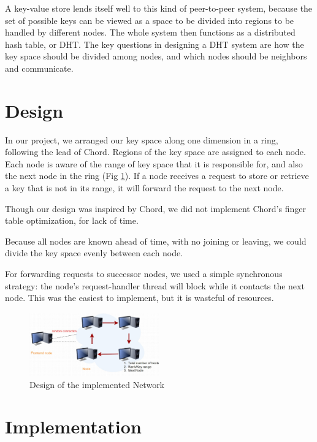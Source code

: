 \documentclass[11pt,conference]{IEEEtran}
\begin{document}
A key-value store lends itself well to this kind of peer-to-peer system, because
the set of possible keys can be viewed as a space to be divided into regions to
be handled by different nodes. The whole system then functions as a distributed
hash table, or DHT. The key questions in designing a DHT system are how the key
space should be divided among nodes, and which nodes should be neighbors and
communicate. \cite{p2plookup}



\section{Design}

In our project, we arranged our key space along one dimension in a ring,
following the lead of Chord\cite{chord}. Regions of the key space are assigned
to each node. Each node is aware of the range of key space that it is
responsible for, and also the next node in the ring (Fig \ref{fig:design}). If a
node receives a request to store or retrieve a key that is not in its range, it
will forward the request to the next node.

Though our design was inspired by Chord, we did not implement Chord's finger
table optimization, for lack of time.

Because all nodes are known ahead of time, with no joining or leaving, we could
divide the key space evenly between each node.

For forwarding requests to successor nodes, we used a simple synchronous
strategy: the node's request-handler thread will block while it contacts the
next node. This was the easiest to implement, but it is wasteful of resources.

\begin{figure}[h!]
  \centering
    \includegraphics[width=0.5\textwidth]{design}
    \caption{Design of the implemented Network}
    \label{fig:design}
\end{figure}


\section{Implementation}
\end{document}
